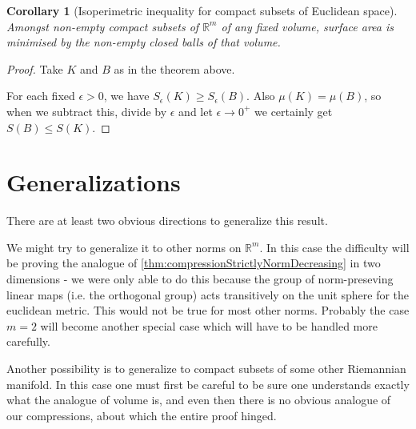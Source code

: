 \documentclass[a4paper,11pt]{article}
\newcommand{\bbR}{\mathbb{R}}
\newtheorem{corollary}[thm]{Corollary}
\begin{document}
\begin{corollary}
[Isoperimetric inequality for compact subsets of Euclidean space]
Amongst non-empty compact subsets of $\bbR^m$ of any fixed volume, surface area
is minimised by the non-empty closed balls of that volume.
\end{corollary}

\begin{proof}
Take $K$ and $B$ as in the theorem above.

For each fixed $\epsilon>0$, we have $S_\epsilon(K)\geq S_\epsilon(B)$.  Also
$\mu(K)=\mu(B)$, so when we subtract this, divide by $\epsilon$
and let $\epsilon\to0^+$ we certainly
get $S(B)\leq S(K)$.
\end{proof}

\begin{comment}
\begin{corollary}
Combining this with \ref{thm:smoothSurfaceAreas}, we deduce that amongst all
smooth compact submainfolds (with boundary) of $\bbR^m$ of dimension $m$ of any
fixed volume, closed balls minimise surface area.
\end{corollary}
\end{comment}

\section{Generalizations}
There are at least two obvious directions to generalize this result.

We might try to generalize it to other norms on $\bbR^m$.  In this case the
difficulty will be proving the analogue of
\ref{thm:compressionStrictlyNormDecreasing} in two dimensions - we were only
able to do this because the group of norm-preseving linear maps (i.e. the
orthogonal group) acts transitively on the unit sphere for the euclidean
metric.  This would not be true for most other norms.  Probably the case $m=2$
will become another special case which will have to be handled more carefully.

Another possibility is to generalize to compact subsets of some other
Riemannian manifold.  In this case one must first be careful to be sure one
understands exactly what the analogue of volume is, and even then there is no
obvious analogue of our compressions, about which the entire proof hinged.
\end{document}
